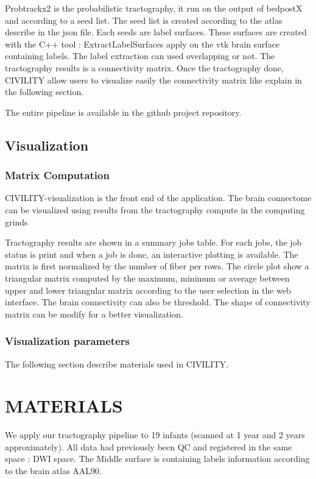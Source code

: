 \documentclass[]{spie}  %
\begin{document}
Probtrackx2 is the probabilistic tractography, it run on the output of bedpostX and according to a seed list. The seed list is created according to the atlas describe in the json file. Each seeds are label surfaces. These surfaces are created with the C++ tool : ExtractLabelSurfaces apply on the vtk brain surface containing labels. The label extraction can used overlapping or not. The tractography results is a connectivity matrix.
Once the tractography done, CIVILITY allow users to visualize easily the connectivity matrix like explain in the following section. 


The entire pipeline is available in the github project repository.

\subsection{Visualization}

\subsubsection{Matrix Computation}

CIVILITY-visualization is the front end of the application. The brain connectome can be visualized using results from the tractography compute in the computing grinds 

Tractography results are shown in a summary jobs table. For each jobs, the job status is print and when a job is done, an interactive plotting is available. The matrix is first normalized by the number of fiber per rows. The circle plot show  a triangular matrix computed by the maximum, minimum or average between upper and lower triangular matrix according to the user selection in the web interface. The brain connectivity can also be threshold. The shape of connectivity matrix can be modify for a better visualization.

\subsubsection{Visualization parameters}

The following section describe materials used in CIVILITY.

\section{MATERIALS}

We apply our tractography pipeline to 19 infants (scanned at 1 year and 2 years approximately).
All data had previously been QC and registered in the same space : DWI space. The Middle surface is containing labels information according to the brain atlas AAL90. 
\end{document}
